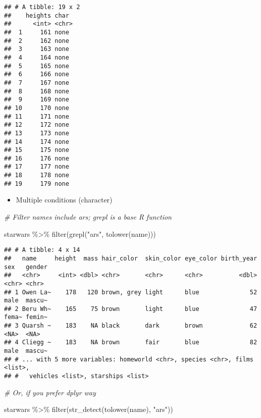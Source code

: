 \documentclass[
]{book}
\newenvironment{Shaded}{\begin{snugshade}}{\end{snugshade}}
\newcommand{\CommentTok}[1]{\textcolor[rgb]{0.56,0.35,0.01}{\textit{#1}}}
\newcommand{\FunctionTok}[1]{\textcolor[rgb]{0.00,0.00,0.00}{#1}}
\newcommand{\NormalTok}[1]{#1}
\newcommand{\SpecialCharTok}[1]{\textcolor[rgb]{0.00,0.00,0.00}{#1}}
\newcommand{\StringTok}[1]{\textcolor[rgb]{0.31,0.60,0.02}{#1}}
\providecommand{\tightlist}{%
  \setlength{\itemsep}{0pt}\setlength{\parskip}{0pt}}
\begin{document}
\begin{verbatim}
## # A tibble: 19 x 2
##    heights char 
##      <int> <chr>
##  1     161 none 
##  2     162 none 
##  3     163 none 
##  4     164 none 
##  5     165 none 
##  6     166 none 
##  7     167 none 
##  8     168 none 
##  9     169 none 
## 10     170 none 
## 11     171 none 
## 12     172 none 
## 13     173 none 
## 14     174 none 
## 15     175 none 
## 16     176 none 
## 17     177 none 
## 18     178 none 
## 19     179 none
\end{verbatim}

\begin{itemize}
\tightlist
\item
  Multiple conditions (character)
\end{itemize}

\begin{Shaded}
\begin{Highlighting}[]
\CommentTok{\# Filter names include ars; \textasciigrave{}grepl\textasciigrave{} is a base R function}

\NormalTok{starwars }\SpecialCharTok{\%\textgreater{}\%}
  \FunctionTok{filter}\NormalTok{(}\FunctionTok{grepl}\NormalTok{(}\StringTok{"ars"}\NormalTok{, }\FunctionTok{tolower}\NormalTok{(name)))}
\end{Highlighting}
\end{Shaded}

\begin{verbatim}
## # A tibble: 4 x 14
##   name     height  mass hair_color  skin_color eye_color birth_year sex   gender
##   <chr>     <int> <dbl> <chr>       <chr>      <chr>          <dbl> <chr> <chr> 
## 1 Owen La~    178   120 brown, grey light      blue              52 male  mascu~
## 2 Beru Wh~    165    75 brown       light      blue              47 fema~ femin~
## 3 Quarsh ~    183    NA black       dark       brown             62 <NA>  <NA>  
## 4 Cliegg ~    183    NA brown       fair       blue              82 male  mascu~
## # ... with 5 more variables: homeworld <chr>, species <chr>, films <list>,
## #   vehicles <list>, starships <list>
\end{verbatim}

\begin{Shaded}
\begin{Highlighting}[]
\CommentTok{\# Or, if you prefer dplyr way}

\NormalTok{starwars }\SpecialCharTok{\%\textgreater{}\%}
  \FunctionTok{filter}\NormalTok{(}\FunctionTok{str\_detect}\NormalTok{(}\FunctionTok{tolower}\NormalTok{(name), }\StringTok{"ars"}\NormalTok{))}
\end{Highlighting}
\end{Shaded}
\end{document}
